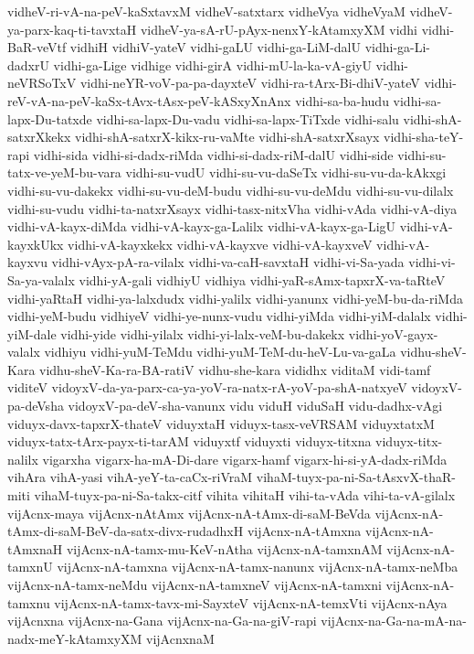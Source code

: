 {vidheV-ri-vA-na-peV-kaSxtavxM
vidheV-satxtarx
vidheVya
vidheVyaM
vidheV-ya-parx-kaq-ti-tavxtaH
vidheV-ya-sA-rU-pAyx-nenxY-kAtamxyXM
vidhi
vidhi-BaR-veVtf
vidhiH
vidhiV-yateV
vidhi-gaLU
vidhi-ga-LiM-dalU
vidhi-ga-Li-dadxrU
vidhi-ga-Lige
vidhige
vidhi-girA
vidhi-mU-la-ka-vA-giyU
vidhi-neVRSoTxV
vidhi-neYR-voV-pa-pa-dayxteV
vidhi-ra-tArx-Bi-dhiV-yateV
vidhi-reV-vA-na-peV-kaSx-tAvx-tAsx-peV-kASxyXnAnx
vidhi-sa-ba-hudu
vidhi-sa-lapx-Du-tatxde
vidhi-sa-lapx-Du-vadu
vidhi-sa-lapx-TiTxde
vidhi-salu
vidhi-shA-satxrXkekx
vidhi-shA-satxrX-kikx-ru-vaMte
vidhi-shA-satxrXsayx
vidhi-sha-teY-rapi
vidhi-sida
vidhi-si-dadx-riMda
vidhi-si-dadx-riM-dalU
vidhi-side
vidhi-su-tatx-ve-yeM-bu-vara
vidhi-su-vudU
vidhi-su-vu-daSeTx
vidhi-su-vu-da-kAkxgi
vidhi-su-vu-dakekx
vidhi-su-vu-deM-budu
vidhi-su-vu-deMdu
vidhi-su-vu-dilalx
vidhi-su-vudu
vidhi-ta-natxrXsayx
vidhi-tasx-nitxVha
vidhi-vAda
vidhi-vA-diya
vidhi-vA-kayx-diMda
vidhi-vA-kayx-ga-Lalilx
vidhi-vA-kayx-ga-LigU
vidhi-vA-kayxkUkx
vidhi-vA-kayxkekx
vidhi-vA-kayxve
vidhi-vA-kayxveV
vidhi-vA-kayxvu
vidhi-vAyx-pA-ra-vilalx
vidhi-va-caH-savxtaH
vidhi-vi-Sa-yada
vidhi-vi-Sa-ya-valalx
vidhi-yA-gali
vidhiyU
vidhiya
vidhi-yaR-sAmx-tapxrX-va-taRteV
vidhi-yaRtaH
vidhi-ya-lalxdudx
vidhi-yalilx
vidhi-yanunx
vidhi-yeM-bu-da-riMda
vidhi-yeM-budu
vidhiyeV
vidhi-ye-nunx-vudu
vidhi-yiMda
vidhi-yiM-dalalx
vidhi-yiM-dale
vidhi-yide
vidhi-yilalx
vidhi-yi-lalx-veM-bu-dakekx
vidhi-yoV-gayx-valalx
vidhiyu
vidhi-yuM-TeMdu
vidhi-yuM-TeM-du-heV-Lu-va-gaLa
vidhu-sheV-Kara
vidhu-sheV-Ka-ra-BA-ratiV
vidhu-she-kara
vididhx
viditaM
vidi-tamf
viditeV
vidoyxV-da-ya-parx-ca-ya-yoV-ra-natx-rA-yoV-pa-shA-natxyeV
vidoyxV-pa-deVsha
vidoyxV-pa-deV-sha-vanunx
vidu
viduH
viduSaH
vidu-dadhx-vAgi
viduyx-davx-tapxrX-thateV
viduyxtaH
viduyx-tasx-veVRSAM
viduyxtatxM
viduyx-tatx-tArx-payx-ti-tarAM
viduyxtf
viduyxti
viduyx-titxna
viduyx-titx-nalilx
vigarxha
vigarx-ha-mA-Di-dare
vigarx-hamf
vigarx-hi-si-yA-dadx-riMda
vihAra
vihA-yasi
vihA-yeY-ta-caCx-riVraM
vihaM-tuyx-pa-ni-Sa-tAsxvX-thaR-miti
vihaM-tuyx-pa-ni-Sa-takx-citf
vihita
vihitaH
vihi-ta-vAda
vihi-ta-vA-gilalx
vijAcnx-maya
vijAcnx-nAtAmx
vijAcnx-nA-tAmx-di-saM-BeVda
vijAcnx-nA-tAmx-di-saM-BeV-da-satx-divx-rudadhxH
vijAcnx-nA-tAmxna
vijAcnx-nA-tAmxnaH
vijAcnx-nA-tamx-mu-KeV-nAtha
vijAcnx-nA-tamxnAM
vijAcnx-nA-tamxnU
vijAcnx-nA-tamxna
vijAcnx-nA-tamx-nanunx
vijAcnx-nA-tamx-neMba
vijAcnx-nA-tamx-neMdu
vijAcnx-nA-tamxneV
vijAcnx-nA-tamxni
vijAcnx-nA-tamxnu
vijAcnx-nA-tamx-tavx-mi-SayxteV
vijAcnx-nA-temxVti
vijAcnx-nAya
vijAcnxna
vijAcnx-na-Gana
vijAcnx-na-Ga-na-giV-rapi
vijAcnx-na-Ga-na-mA-na-nadx-meY-kAtamxyXM
vijAcnxnaM
}
